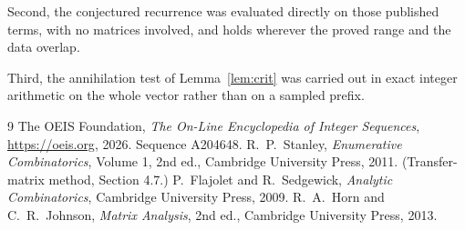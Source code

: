 \documentclass[11pt,a4paper]{article}
\theoremstyle{plain}
\theoremstyle{definition}
\begin{document}
Second, the conjectured recurrence was evaluated directly on those published terms, with no
matrices involved, and holds wherever the proved range and the data overlap.

Third, the annihilation test of Lemma~\ref{lem:crit} was carried out in exact integer
arithmetic on the whole vector rather than on a sampled prefix.

\begin{thebibliography}{9}
 The OEIS Foundation, \emph{The On-Line Encyclopedia of Integer
Sequences}, \url{https://oeis.org}, 2026. Sequence A204648.
 R.~P.~Stanley, \emph{Enumerative Combinatorics}, Volume 1, 2nd ed.,
Cambridge University Press, 2011. (Transfer-matrix method, Section 4.7.)
 P.~Flajolet and R.~Sedgewick, \emph{Analytic Combinatorics}, Cambridge
University Press, 2009.
 R.~A.~Horn and C.~R.~Johnson, \emph{Matrix Analysis}, 2nd ed., Cambridge
University Press, 2013.
\end{thebibliography}
\end{document}
